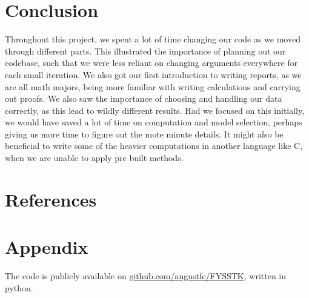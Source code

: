 \documentclass{article}
\begin{document}
\section{Conclusion}
Throughout this project, we spent a lot of time changing our code as we moved through different parts. This illustrated the importance of planning out our codebase, such that we were less reliant on changing arguments everywhere for each small iteration. We also got our first introduction to writing reports, as we are all math majors, being more familiar with writing calculations and carrying out proofs. We also saw the importance of choosing and handling our data correctly, as this lead to wildly different results. Had we focused on this initially, we would have saved a lot of time on computation and model selection, perhaps giving us more time to figure out the mote minute details. It might also be beneficial to write some of the heavier computations in another language like C, when we are unable to apply pre built methods.

\section{References}


\section{Appendix}
The code is publicly available on \href{https://github.com/augustfe/FYSSTK}{github.com/augustfe/FYSSTK}, written in python.
\end{document}
